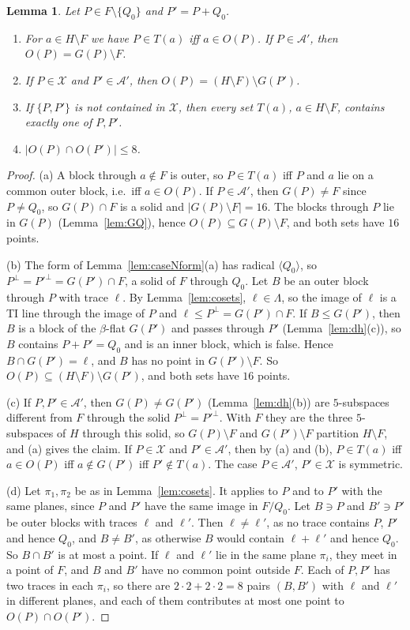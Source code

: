 \documentclass[11pt]{amsart}
\newtheorem{lemma}[theorem]{Lemma}
\theoremstyle{definition}
\newcommand{\X}{\mathcal{X}}
\newcommand{\A}{\mathcal{A}}
\begin{document}
\begin{lemma}\label{lem:Opairs}
Let $P\in F\setminus\{Q_0\}$ and $P'=P+Q_0$.
\begin{enumerate}[label=(\alph*)]
\item For $a\in H\setminus F$ we have $P\in T(a)$ iff $a\in O(P)$. If $P\in\A'$, then $O(P)=G(P)\setminus F$.
\item If $P\in\X$ and $P'\in\A'$, then $O(P)=(H\setminus F)\setminus G(P')$.
\item If $\{P,P'\}$ is not contained in $\X$, then every set $T(a)$, $a\in H\setminus F$, contains exactly one of $P,P'$.
\item $|O(P)\cap O(P')|\le8$.
\end{enumerate}
\end{lemma}
\begin{proof}
(a) A block through $a\notin F$ is outer, so $P\in T(a)$ iff $P$ and $a$ lie on a common outer block, i.e.\ iff $a\in O(P)$. If $P\in\A'$, then $G(P)\ne F$ since $P\ne Q_0$, so $G(P)\cap F$ is a solid and $|G(P)\setminus F|=16$. The blocks through $P$ lie in $G(P)$ (Lemma~\ref{lem:GQ}), hence $O(P)\subseteq G(P)\setminus F$, and both sets have $16$ points.

(b) The form of Lemma~\ref{lem:caseNform}(a) has radical $\langle Q_0\rangle$, so $P^\perp=P'^\perp=G(P')\cap F$, a solid of $F$ through $Q_0$. Let $B$ be an outer block through $P$ with trace $\ell$. By Lemma~\ref{lem:cosets}, $\ell\in\Lambda$, so the image of $\ell$ is a TI line through the image of $P$ and $\ell\le P^\perp=G(P')\cap F$. If $B\le G(P')$, then $B$ is a block of the $\beta$-flat $G(P')$ and passes through $P'$ (Lemma~\ref{lem:dh}(c)), so $B$ contains $P+P'=Q_0$ and is an inner block, which is false. Hence $B\cap G(P')=\ell$, and $B$ has no point in $G(P')\setminus F$. So $O(P)\subseteq(H\setminus F)\setminus G(P')$, and both sets have $16$ points.

(c) If $P,P'\in\A'$, then $G(P)\ne G(P')$ (Lemma~\ref{lem:dh}(b)) are $5$-subspaces different from $F$ through the solid $P^\perp=P'^\perp$. With $F$ they are the three $5$-subspaces of $H$ through this solid, so $G(P)\setminus F$ and $G(P')\setminus F$ partition $H\setminus F$, and (a) gives the claim. If $P\in\X$ and $P'\in\A'$, then by (a) and (b), $P\in T(a)$ iff $a\in O(P)$ iff $a\notin G(P')$ iff $P'\notin T(a)$. The case $P\in\A'$, $P'\in\X$ is symmetric.

(d) Let $\pi_1,\pi_2$ be as in Lemma~\ref{lem:cosets}. It applies to $P$ and to $P'$ with the same planes, since $P$ and $P'$ have the same image in $F/Q_0$. Let $B\ni P$ and $B'\ni P'$ be outer blocks with traces $\ell$ and $\ell'$. Then $\ell\ne\ell'$, as no trace contains $P$, $P'$ and hence $Q_0$, and $B\ne B'$, as otherwise $B$ would contain $\ell+\ell'$ and hence $Q_0$. So $B\cap B'$ is at most a point. If $\ell$ and $\ell'$ lie in the same plane $\pi_i$, they meet in a point of $F$, and $B$ and $B'$ have no common point outside $F$. Each of $P,P'$ has two traces in each $\pi_i$, so there are $2\cdot2+2\cdot2=8$ pairs $(B,B')$ with $\ell$ and $\ell'$ in different planes, and each of them contributes at most one point to $O(P)\cap O(P')$.
\end{proof}
\end{document}
